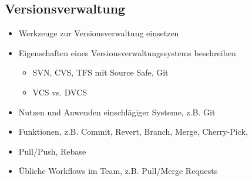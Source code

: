 \subsection{Versionsverwaltung}
\label{sec:Versionsverwaltung} 

\begin{itemize}
	\item Werkzeuge zur Versionsverwaltung einsetzen
	\item Eigenschaften eines Versionsverwaltungssystems beschreiben
	\begin{itemize}
		\item SVN, CVS, TFS mit Source Safe, Git
		\item VCS vs. DVCS
	\end{itemize}
	\item Nutzen und Anwenden einschlägiger Systeme, z.B. Git
	\item Funktionen, z.B. Commit, Revert, Branch, Merge, Cherry-Pick, \item Pull/Push, Rebase
	\item Übliche Workflows im Team, z.B. Pull/Merge Requests
\end{itemize}

